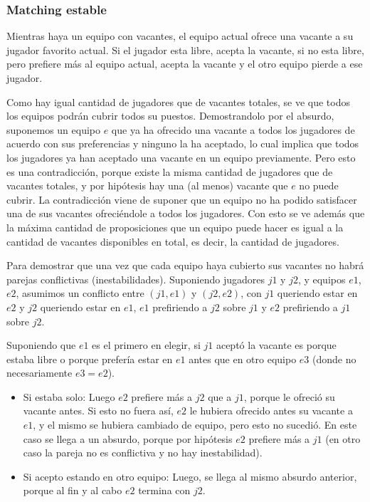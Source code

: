\documentclass[article,a4paper]{article}
\begin{document}
\subsubsection{Matching estable}

Mientras haya un equipo con vacantes, el equipo actual ofrece una vacante a su jugador favorito actual. Si el jugador esta libre, acepta la vacante, si no esta libre, pero prefiere más al equipo actual, acepta la vacante y el otro equipo pierde a ese jugador.

Como hay igual cantidad de jugadores que de vacantes totales, se ve que todos los equipos podrán cubrir todos su puestos. Demostrandolo por el absurdo, suponemos un equipo $e$ que ya ha ofrecido una vacante a todos los jugadores de acuerdo con sus preferencias y ninguno la ha aceptado, lo cual implica que todos los jugadores ya han aceptado una vacante en un equipo previamente. Pero esto es una contradicción, porque existe la misma cantidad de jugadores que de vacantes totales, y por hipótesis hay una (al menos) vacante que $e$ no puede cubrir. La contradicción viene de suponer que un equipo no ha podido satisfacer una de sus vacantes ofreciéndole a todos los jugadores. Con esto se ve además que la máxima cantidad de proposiciones que un equipo puede hacer es igual a la cantidad de vacantes disponibles en total, es decir, la cantidad de jugadores.

Para demostrar que una vez que cada equipo haya cubierto sus vacantes no habrá parejas conflictivas (inestabilidades). Suponiendo jugadores $j1$ y $j2$, y equipos $e1$, $e2$, asumimos un conflicto entre $(j1,e1)$ y $(j2,e2)$, con $j1$ queriendo estar en $e2$ y $j2$ queriendo estar en $e1$, $e1$ prefiriendo a $j2$ sobre $j1$ y $e2$ prefiriendo a $j1$ sobre $j2$.

Suponiendo que $e1$ es el primero en elegir, si $j1$ aceptó la vacante es porque estaba libre o porque prefería estar en $e1$ antes que en otro equipo $e3$ (donde no necesariamente $e3 = e2$).     

\begin{itemize}
\item{Si estaba solo: } Luego $e2$ prefiere más a $j2$ que a $j1$, porque le ofreció su vacante antes. Si esto no fuera así, $e2$ le hubiera ofrecido antes su vacante a $e1$, y el mismo se hubiera cambiado de equipo, pero esto no sucedió. En este caso se llega a un absurdo, porque por hipótesis $e2$ prefiere más a $j1$ (en otro caso la pareja no es conflictiva y no hay inestabilidad).
\item{Si acepto estando en otro equipo: } Luego, se llega al mismo absurdo anterior, porque al fin y al cabo $e2$ termina con $j2$.
\end{itemize}
\end{document}
